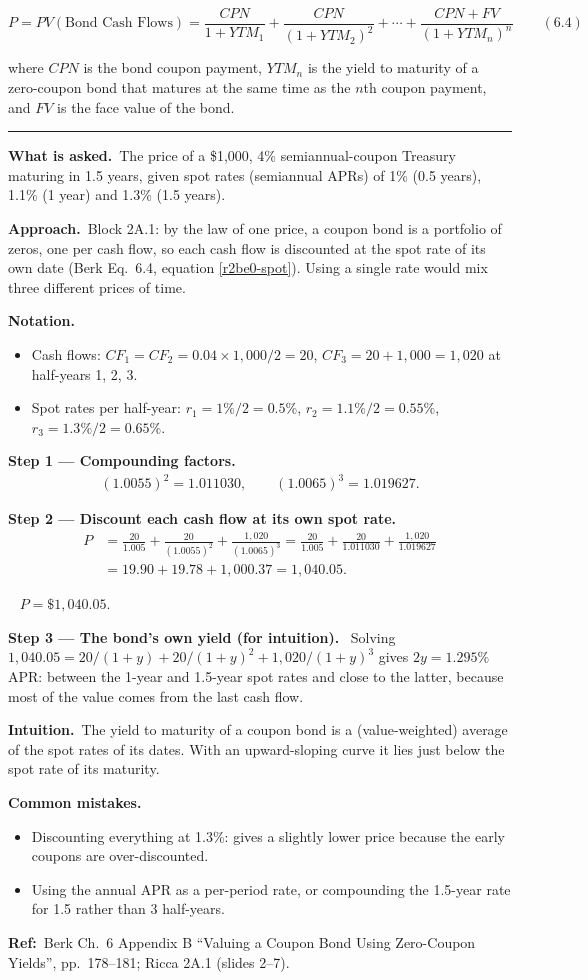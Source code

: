 \documentclass[11pt,a4paper]{article}
\newcommand{\notation}{\par\noindent\textbf{Notation.}}
\newcommand{\step}[2]{\par\medskip\noindent\textbf{Step #1 --- #2.}~}
\newcommand{\intuition}{\par\medskip\noindent\textbf{Intuition.}~}
\newcommand{\refbib}{\par\smallskip\noindent\textbf{Ref:}~}
\newcommand{\asked}{\par\medskip\noindent\textbf{What is asked.}~}
\newcommand{\approach}{\par\smallskip\noindent\textbf{Approach.}~}
\newcommand{\answer}[1]{\par\smallskip\noindent\fbox{\textbf{Answer #1.}}~}
\newcommand{\pitfalls}{\par\medskip\noindent\textbf{Common mistakes.}}
\newcommand{\stmtend}{\par\endgroup\nopagebreak\noindent\rule{\linewidth}{0.4pt}\par\medskip}
\begin{document}
\[P = PV(\text{Bond Cash Flows}) = \frac{CPN}{1+YTM_1} + \frac{CPN}{(1+YTM_2)^2} + \cdots + \frac{CPN + FV}{(1+YTM_n)^n} \qquad (6.4)\]

where \(CPN\) is the bond coupon payment, \(YTM_n\) is the yield to maturity of a zero-coupon bond
that matures at the same time as the \(n\)th coupon payment, and \(FV\) is the face value of the
bond.
\stmtend

\asked The price of a \$1,000, 4\% semiannual-coupon Treasury maturing in 1.5 years, given spot rates (semiannual APRs)
of 1\% (0.5 years), 1.1\% (1 year) and 1.3\% (1.5 years).

\approach Block 2A.1: by the law of one price, a coupon bond is a portfolio of zeros, one per cash flow, so each cash flow
is discounted at the spot rate of its own date (Berk Eq.~6.4, equation \eqref{r2be0-spot}). Using a single rate would mix
three different prices of time.

\notation
\begin{itemize}
  \item Cash flows: $CF_1=CF_2=0.04\times1{,}000/2=20$, $CF_3=20+1{,}000=1{,}020$ at half-years 1, 2, 3.
  \item Spot rates per half-year: $r_1=1\%/2=0.5\%$, $r_2=1.1\%/2=0.55\%$, $r_3=1.3\%/2=0.65\%$.
\end{itemize}

\step{1}{Compounding factors}
\begin{align}
  (1.0055)^2 = 1.011030,\qquad (1.0065)^3 = 1.019627. \label{r2be8-f}
\end{align}

\step{2}{Discount each cash flow at its own spot rate}
\begin{align}
  P &= \frac{20}{1.005} + \frac{20}{(1.0055)^2} + \frac{1{,}020}{(1.0065)^3}
     = \frac{20}{1.005} + \frac{20}{1.011030} + \frac{1{,}020}{1.019627} \nonumber\\
    &= 19.90 + 19.78 + 1{,}000.37 = 1{,}040.05. \label{r2be8-P}
\end{align}
\answer{\unskip} $P=\$1{,}040.05$.

\step{3}{The bond's own yield (for intuition)} Solving $1{,}040.05 = 20/(1+y)+20/(1+y)^2+1{,}020/(1+y)^3$ gives $2y=1.295\%$
APR: between the 1-year and 1.5-year spot rates and close to the latter, because most of the value comes from the last cash flow.

\intuition The yield to maturity of a coupon bond is a (value-weighted) average of the spot rates of its dates. With an
upward-sloping curve it lies just below the spot rate of its maturity.
\pitfalls
\begin{itemize}
  \item Discounting everything at 1.3\%: gives a slightly lower price because the early coupons are over-discounted.
  \item Using the annual APR as a per-period rate, or compounding the 1.5-year rate for 1.5 rather than 3 half-years.
\end{itemize}
\refbib{Berk Ch.~6 Appendix B ``Valuing a Coupon Bond Using Zero-Coupon Yields'', pp.~178--181; Ricca 2A.1 (slides 2--7).}
\end{document}
